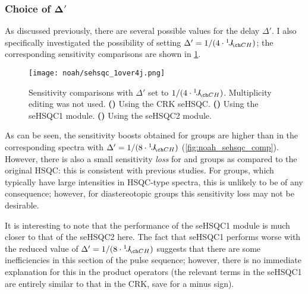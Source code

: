 \subsubsection{Choice of $\symbf{\Delta'}$}

As discussed previously, there are several possible values for the delay $\Delta'$.
I also specifically investigated the possibility of setting $\Delta' = 1 / (4 \cdot \oneJ{CH})$; the corresponding sensitivity comparisons are shown in \cref{fig:noah_sehsqc_1over4j}.

\begin{figure}[!ht]
    \centering
    \texttt{[image: noah/sehsqc\_1over4j.png]}%
    {\label{fig:noah_sehsqc_1over4j_crk}}%
    {\label{fig:noah_sehsqc_1over4j_1}}%
    {\label{fig:noah_sehsqc_1over4j_2}}%
    \caption[Sensitivity comparisons for seHSQC with $\Delta' = 1 / (4 \cdot \oneJ{CH})$]{
        Sensitivity comparisons with $\Delta'$ set to $1 / (4 \cdot \oneJ{CH})$.
        Multiplicity editing was not used.
        \textbf{()} Using the CRK seHSQC.
        \textbf{()} Using the seHSQC1 module.
        \textbf{()} Using the seHSQC2 module.
    }
    \label{fig:noah_sehsqc_1over4j}
\end{figure}

As can be seen, the sensitivity boosts obtained for  groups are higher than in the corresponding spectra with $\Delta' = 1 / (8 \cdot \oneJ{CH})$ (\cref{fig:noah_sehsqc_comp}).
However, there is also a small sensitivity \textit{loss} for  and  groups as compared to the original HSQC: this is consistent with previous studies\autocite{Schleucher1994JBNMR}.
For  groups, which typically have large intensities in HSQC-type spectra, this is unlikely to be of any consequence; however, for diastereotopic  groups this sensitivity loss may not be desirable.

It is interesting to note that the performance of the seHSQC1 module is much closer to that of the seHSQC2 here.
The fact that seHSQC1 performs worse with the reduced value of $\Delta' = 1 / (8 \cdot \oneJ{CH})$ suggests that there are some inefficiencies in this section of the pulse sequence; however, there is no immediate explanation for this in the product operators (the relevant terms in the seHSQC1 are entirely similar to that in the CRK, save for a minus sign).

